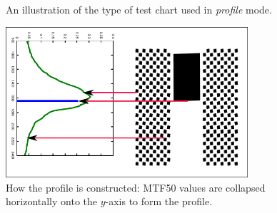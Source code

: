\documentclass[a4paper]{article}
\begin{document}
\begin{figure}
\centering
{}
\caption{An illustration of the type of test chart used in \emph{profile}
mode.}
\label{fig:profile_test_chart}
\end{figure}

\begin{figure}
\centering
\includegraphics[width=0.8\textwidth]{figures/profile_construction}
\caption{How the profile is constructed: MTF50 values are collapsed
horizontally onto the $y$-axis to form the profile.}
\label{fig:profile_construction}
\end{figure}
\end{document}
